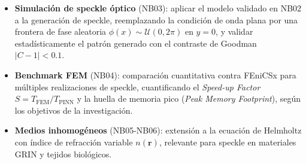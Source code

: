\begin{itemize}
  \item \textbf{Simulación de speckle óptico} (NB03): aplicar el modelo validado en NB02
    a la generación de speckle, reemplazando la condición de onda plana por una frontera
    de fase aleatoria $\phi(x) \sim \mathcal{U}(0, 2\pi)$ en $y = 0$, y validar
    estadísticamente el patrón generado con el contraste de Goodman $|C - 1| < 0.1$.

  \item \textbf{Benchmark FEM} (NB04): comparación cuantitativa contra FEniCSx para
    múltiples realizaciones de speckle, cuantificando el \textit{Speed-up Factor}
    $S = T_{\mathrm{FEM}} / T_{\mathrm{PINN}}$ \cite{Thuerey2021_PBDL} y la
    huella de memoria pico (\textit{Peak Memory Footprint}), según los objetivos
    de la investigación.

  \item \textbf{Medios inhomogéneos} (NB05-NB06): extensión a la ecuación de Helmholtz
    con índice de refracción variable $n(\mathbf{r})$, relevante para speckle en
    materiales GRIN y tejidos biológicos.
\end{itemize}
